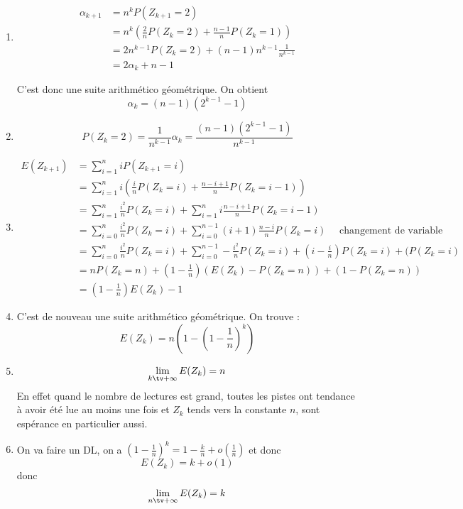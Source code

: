 \begin{correction}
\begin{enumerate}
\item \begin{align*}
\alpha_{k+1} &= n^{k} P(Z_{k+1} = 2) \\
					&= n^k  \left(  \frac{2}{n} P(Z_k =2 ) + \frac{n-1}{n} P(Z_k =1)	 \right)\\
					&= 2 n^{k-1}   P(Z_k =2 ) + (n-1)n^{k-1} \frac{1}{n^{k-1}} 	 \\
					&= 2 \alpha_k+ n-1
\end{align*}

C'est donc une suite arithmético géométrique. On obtient 
$$\alpha_k = (n-1) (2^{k-1} -1)$$

\item $$P(Z_k=2) = \frac{1}{n^{k-1}}\alpha_k = \frac{ (n-1) (2^{k-1} -1)}{n^{k-1}}$$
\item \begin{align*}
E(Z_{k+1})&= \sum_{i=1}^n i P(Z_{k+1} =i )\\
				&= \sum_{i=1}^n  i\left(\frac{i}{n} P(Z_k =i ) + \frac{n-i+1}{n} P(Z_k =i-1)\right)	\\
				&= \sum_{i=1}^n \frac{i^2}{n} P(Z_k =i ) + \sum_{i=1}^n i    \frac{n-i+1}{n} P(Z_k =i-1)\\
				&= \sum_{i=0}^n \frac{i^2}{n} P(Z_k =i ) + \sum_{i=0}^{n-1} (i+1)    \frac{n-i}{n} P(Z_k =i) \quad \text{ changement de variable}\\
					&= \sum_{i=0}^n \frac{i^2}{n} P(Z_k =i ) + \sum_{i=0}^{n-1}  -\frac{i^2}{n} 
					P(Z_k =i) + (i-\frac{i}{n}) P(Z_k=i) + (P(Z_k=i)\\
					&= nP(Z_k=n) + (1-\frac{1}{n}) (E(Z_k) - P(Z_k=n) ) + (1 - P(Z_k=n))\\
					&= (1-\frac{1}{n})E(Z_k)  - 1 
\end{align*}



\item C'est de nouveau une suite arithmético géométrique. On trouve : 
$$E(Z_k) = n \left( 1 - \left(1- \frac{1}{n}\right)^k\right)$$

\item $$\lim_{k\tv +\infty } E(Z_k) =  n$$
En effet quand le nombre de lectures est grand, toutes les pistes ont tendance à avoir été lue au moins une fois et $Z_k$ tends vers la constante $n$, sont espérance en particulier aussi. 

\item On  va faire un DL, on a $\left(1- \frac{1}{n}\right)^k = 1- \frac{k}{n} +o(\frac{1}{n})$
et donc 
$$E(Z_k) = k +o(1)$$
donc $$\lim_{n\tv +\infty } E(Z_k) =  k$$


\end{enumerate}
\end{correction}
